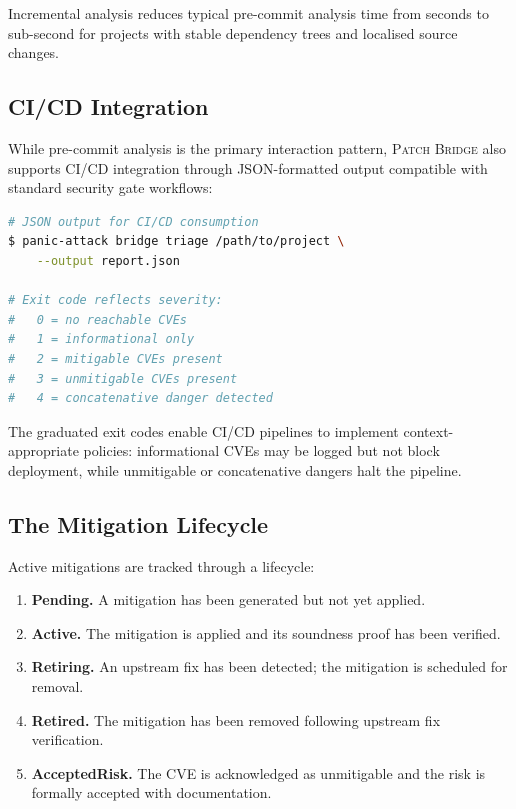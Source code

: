 \documentclass[11pt,twocolumn]{article}
\begin{document}
Incremental analysis reduces typical pre-commit analysis time from
seconds to sub-second for projects with stable dependency trees and
localised source changes.

\subsection{CI/CD Integration}

While pre-commit analysis is the primary interaction pattern,
\textsc{Patch Bridge} also supports CI/CD integration through
JSON-formatted output compatible with standard security gate
workflows:

\begin{lstlisting}[language=bash,caption={CI/CD integration},label=lst:cicd]
# JSON output for CI/CD consumption
$ panic-attack bridge triage /path/to/project \
    --output report.json

# Exit code reflects severity:
#   0 = no reachable CVEs
#   1 = informational only
#   2 = mitigable CVEs present
#   3 = unmitigable CVEs present
#   4 = concatenative danger detected
\end{lstlisting}

The graduated exit codes enable CI/CD pipelines to implement
context-appropriate policies: informational CVEs may be logged but
not block deployment, while unmitigable or concatenative dangers
halt the pipeline.

\subsection{The Mitigation Lifecycle}

Active mitigations are tracked through a lifecycle:

\begin{enumerate}[nosep]
  \item \textbf{Pending.} A mitigation has been generated but not yet
    applied.
  \item \textbf{Active.} The mitigation is applied and its soundness
    proof has been verified.
  \item \textbf{Retiring.} An upstream fix has been detected; the
    mitigation is scheduled for removal.
  \item \textbf{Retired.} The mitigation has been removed following
    upstream fix verification.
  \item \textbf{AcceptedRisk.} The CVE is acknowledged as unmitigable
    and the risk is formally accepted with documentation.
\end{enumerate}
\end{document}
